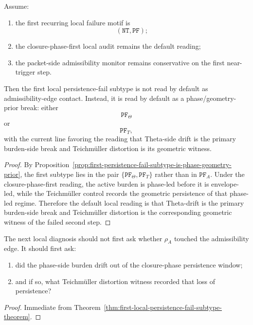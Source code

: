 \begin{theorem}
\label{thm:first-local-persistence-fail-subtype-theorem}
Assume:
\begin{enumerate}
 \item the first recurring local failure motif is
 \[
 (\mathtt{NT},\mathtt{PF});
 \]
 \item the closure-phase-first local audit remains the default reading;
 \item the packet-side admissibility monitor remains conservative on the first near-trigger step.
\end{enumerate}
Then the first local persistence-fail subtype is not read by default as admissibility-edge contact.
Instead, it is read by default as a phase/geometry-prior break:
either
\[
\mathtt{PF}_{\Theta}
\]
or
\[
\mathtt{PF}_{T},
\]
with the current line favoring the reading that Theta-side drift is the primary burden-side break and Teichm\"uller distortion is its geometric witness.
\end{theorem}

\begin{proof}
By Proposition~\ref{prop:first-persistence-fail-subtype-is-phase-geometry-prior}, the first subtype lies in the pair \(\{\mathtt{PF}_{\Theta},\mathtt{PF}_{T}\}\) rather than in \(\mathtt{PF}_{A}\).
Under the closure-phase-first reading, the active burden is phase-led before it is envelope-led, while the Teichm\"uller control records the geometric persistence of that phase-led regime.
Therefore the default local reading is that Theta-drift is the primary burden-side break and Teichm\"uller distortion is the corresponding geometric witness of the failed second step.
\end{proof}

\begin{corollary}
\label{cor:current-post-r18-local-diagnosis-rule}
The next local diagnosis should not first ask whether \(\rho_A\) touched the admissibility edge.
It should first ask:
\begin{enumerate}
 \item did the phase-side burden drift out of the closure-phase persistence window;
 \item and if so, what Teichm\"uller distortion witness recorded that loss of persistence?
\end{enumerate}
\end{corollary}

\begin{proof}
Immediate from Theorem~\ref{thm:first-local-persistence-fail-subtype-theorem}.
\end{proof}


